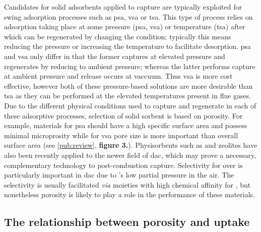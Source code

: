 Candidates for solid \glspl{adsorbent} applied to  capture are typically exploited for swing adsorption processes such as \acrfull{psa}, \acrfull{vsa} or \acrfull{tsa}. This type of process relies on \gls{adsorption} taking place at some pressure (\acrshort{psa}, \acrshort{vsa}) or temperature (\acrshort{tsa}) after which  can be regenerated by changing the condition; typically this means reducing the pressure or increasing the temperature to facilitate desorption.\citep{bahamon2018energetic, hedin2013adsorbents, Zhao2018Synthesis, adewole2013current, ho2008reducing}  \acrshort{psa} and \acrshort{vsa} only differ in that the former captures  at elevated pressure and regenerates by reducing to ambient pressure; whereas the latter performs capture at ambient pressure and release occurs at vaccuum. Thus \acrshort{vsa} is more cost effective, however both of these pressure-based solutions are more desirable than \acrshort{tsa} as they can be performed at the elevated temperatures present in flue gases.\citep{ho2008reducing, adewole2013current, Pirngruber2013} Due to the different physical conditions used to capture and regenerate  in each of these adsorptive processes, selection of solid sorbent is based on porosity. For example, materials for \acrshort{psa} should have a high specific surface area and possess minimal microprosity while for \acrshort{vsa} pore size is more important than overall surface area (see \ref{pub:review}, \textbf{figure 3.}).\citep{ho2008reducing, Chou2004, Presser2011Effect} Physisorbents such as  and zeolites have also been recently applied to the newer field of \acrfull{dac}, which may prove a necessary, complementary technology to post-combustion capture.\citep{kumar2015direct, mcqueen2021review, deutz2021life} Selectivity for  over  is particularly important in \acrshort{dac} due to 's low partial pressure in the air. The selectivity is usually facilitated \textit{via} moieties with high chemical affinity for , but nonetheless porosity is likely to play a role in the performance of these materials.\citep{kumar2015direct, darunte2016direct, deng2021comparative}

\subsection{\texorpdfstring{The relationship between porosity and  uptake}{The relationship between porosity and CO2 uptake}}

